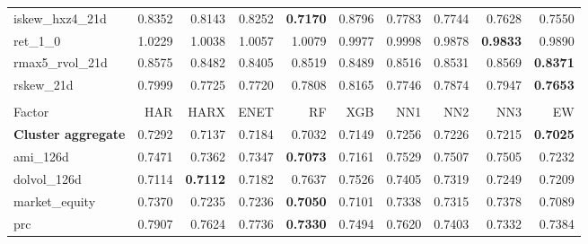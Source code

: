 \begin{longtable}{>{\raggedright\arraybackslash}p{2.6cm}rrrrrrrrr}
iskew\_hxz4\_21d & 0.8352 & \cellcolor{blue!10}0.8143 & \cellcolor{blue!10}0.8252 & \textbf{\cellcolor{blue!10}0.7170} & 0.8796 & \cellcolor{blue!10}0.7783 & \cellcolor{blue!10}0.7744 & \cellcolor{blue!10}0.7628 & \cellcolor{blue!10}0.7550 \\
ret\_1\_0 & 1.0229 & \cellcolor{blue!10}1.0038 & \cellcolor{blue!10}1.0057 & \cellcolor{blue!10}1.0079 & \cellcolor{blue!10}0.9977 & \cellcolor{blue!10}0.9998 & \cellcolor{blue!10}0.9878 & \textbf{\cellcolor{blue!10}0.9833} & \cellcolor{blue!10}0.9890 \\
rmax5\_rvol\_21d & 0.8575 & \cellcolor{blue!10}0.8482 & \cellcolor{blue!10}0.8405 & \cellcolor{blue!10}0.8519 & \cellcolor{blue!10}0.8489 & \cellcolor{blue!10}0.8516 & \cellcolor{blue!10}0.8531 & \cellcolor{blue!10}0.8569 & \textbf{\cellcolor{blue!10}0.8371} \\
rskew\_21d & 0.7999 & \cellcolor{blue!10}0.7725 & \cellcolor{blue!10}0.7720 & \cellcolor{blue!10}0.7808 & 0.8165 & \cellcolor{blue!10}0.7746 & \cellcolor{blue!10}0.7874 & \cellcolor{blue!10}0.7947 & \textbf{\cellcolor{blue!10}0.7653} \\
\hline
\multicolumn{10}{@{}l}{\textit{Panel L. Size}} \\
\hline
Factor & HAR & HARX & ENET & RF & XGB & NN1 & NN2 & NN3 & EW \\
\hline
\textbf{Cluster aggregate} & 0.7292 & \cellcolor{blue!10}0.7137 & \cellcolor{blue!10}0.7184 & \cellcolor{blue!10}0.7032 & \cellcolor{blue!10}0.7149 & \cellcolor{blue!10}0.7256 & \cellcolor{blue!10}0.7226 & \cellcolor{blue!10}0.7215 & \textbf{\cellcolor{blue!10}0.7025} \\
ami\_126d & 0.7471 & \cellcolor{blue!10}0.7362 & \cellcolor{blue!10}0.7347 & \textbf{\cellcolor{blue!10}0.7073} & \cellcolor{blue!10}0.7161 & 0.7529 & 0.7507 & 0.7505 & \cellcolor{blue!10}0.7232 \\
dolvol\_126d & 0.7114 & \textbf{\cellcolor{blue!10}0.7112} & 0.7182 & 0.7637 & 0.7526 & 0.7405 & 0.7319 & 0.7249 & 0.7209 \\
market\_equity & 0.7370 & \cellcolor{blue!10}0.7235 & \cellcolor{blue!10}0.7236 & \textbf{\cellcolor{blue!10}0.7050} & \cellcolor{blue!10}0.7101 & \cellcolor{blue!10}0.7338 & \cellcolor{blue!10}0.7315 & 0.7378 & \cellcolor{blue!10}0.7089 \\
prc & 0.7907 & \cellcolor{blue!10}0.7624 & \cellcolor{blue!10}0.7736 & \textbf{\cellcolor{blue!10}0.7330} & \cellcolor{blue!10}0.7494 & \cellcolor{blue!10}0.7620 & \cellcolor{blue!10}0.7403 & \cellcolor{blue!10}0.7332 & \cellcolor{blue!10}0.7384 \\

\end{longtable}
